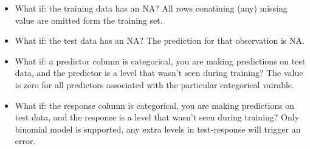 \begin{itemize}
\item What if: the training data has an NA? All rows conatining (any) missing value are omitted form the training set. 

\item What if: the test data has an NA? The prediction for that observation is NA.

\item What if: a predictor column is categorical, you are making predictions on test data, and the predictor is
a level that wasn't seen during training? The value is zero for all predictors associated with the particular categorical vairable.

\item What if: the response column is categorical, you are making predictions on test data, and the response is
a level that wasn't seen during training? Only binomial model is supported, any extra levels in test-response will trigger an error.
\end{itemize}





